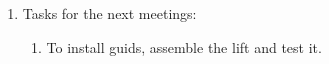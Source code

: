 \begin{enumerate}
\begin{enumerate}
    \end{enumerate}
    \newpage
    
	\item Tasks for the next meetings:
	\begin{enumerate}
	  \item To install guids, assemble the lift and test it.
	  
    \end{enumerate}     
\end{enumerate}
\fillpage
